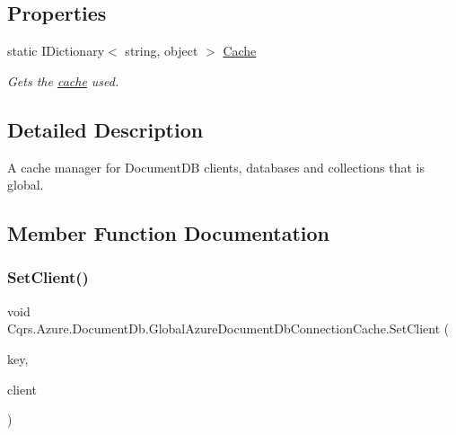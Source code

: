\subsection*{Properties}
\begin{DoxyCompactItemize}
\item 
static I\+Dictionary$<$ string, object $>$ \hyperlink{classCqrs_1_1Azure_1_1DocumentDb_1_1GlobalAzureDocumentDbConnectionCache_af0ae16df0d819bebc5454377ec97c242_af0ae16df0d819bebc5454377ec97c242}{Cache}
\begin{DoxyCompactList}\small\item\em Gets the \hyperlink{}{cache} used. \end{DoxyCompactList}\end{DoxyCompactItemize}


\subsection{Detailed Description}
A cache manager for Document\+DB clients, databases and collections that is global. 



\subsection{Member Function Documentation}
\mbox{\label{classCqrs_1_1Azure_1_1DocumentDb_1_1GlobalAzureDocumentDbConnectionCache_a4fbca6dadf7b2d1ffa753d755982820b_a4fbca6dadf7b2d1ffa753d755982820b}} 
\subsubsection{\texorpdfstring{Set\+Client()}{SetClient()}}
{\footnotesize\ttfamily void Cqrs.\+Azure.\+Document\+Db.\+Global\+Azure\+Document\+Db\+Connection\+Cache.\+Set\+Client (\begin{DoxyParamCaption}\item[{string}]{key,  }\item[{Document\+Client}]{client }\end{DoxyParamCaption})}



